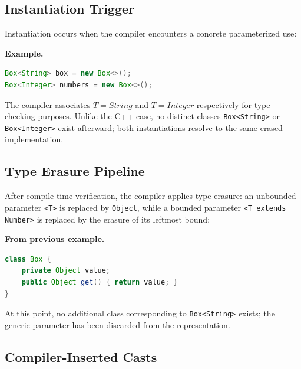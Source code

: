 \documentclass[11pt]{report}
\begin{document}

\subsection{Instantiation Trigger}

Instantiation occurs when the compiler encounters a concrete parameterized
use:

\begin{examplebox}
\textbf{Example.}
\begin{lstlisting}[language=Java]
Box<String> box = new Box<>();
Box<Integer> numbers = new Box<>();
\end{lstlisting}
The compiler associates $T = String$ and $T = Integer$ respectively for
type-checking purposes. Unlike the C++ case, no distinct classes
\texttt{Box<String>} or \texttt{Box<Integer>} exist afterward; both
instantiations resolve to the same erased implementation.
\end{examplebox}


\subsection{Type Erasure Pipeline}

After compile-time verification, the compiler applies type erasure: an
unbounded parameter \texttt{<T>} is replaced by \texttt{Object}, while a
bounded parameter \texttt{<T extends Number>} is replaced by the erasure of
its leftmost bound:

\begin{examplebox}
\textbf{From previous example.}
\begin{lstlisting}[language=Java]
class Box {
    private Object value;
    public Object get() { return value; }
}
\end{lstlisting}
\end{examplebox}

At this point, no additional class corresponding to \texttt{Box<String>}
exists; the generic parameter has been discarded from the representation.


\subsection{Compiler-Inserted Casts}
\end{document}
